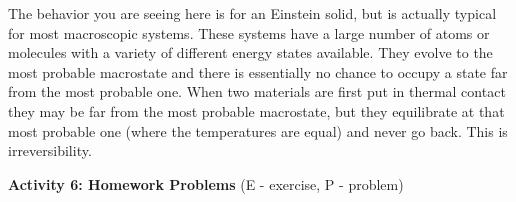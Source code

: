 The behavior you are seeing here is for an Einstein solid, but is actually typical for
most macroscopic systems. These systems have a large number of atoms or molecules
with a variety of different energy states available.
They evolve to the most probable macrostate and there is essentially no chance to occupy a state
far from the most probable one. 
When two materials are first put in thermal contact they may be far from the most probable 
macrostate, but they equilibrate at that most probable one (where the temperatures are equal)
and never go back.
This is irreversibility.

\vspace{15mm}


\bigskip

\textbf{Activity 6: Homework Problems} (E - exercise, P - problem)

